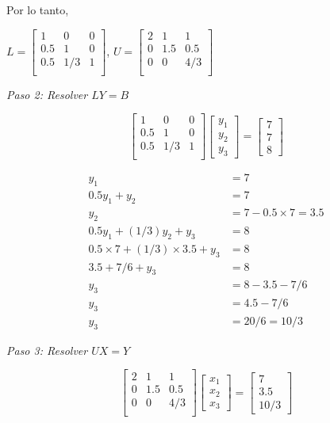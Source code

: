 \documentclass[12pt]{article}
\begin{document}
Por lo tanto,

$L = 
\begin{bmatrix}
1 & 0 & 0 \\
0.5 & 1 & 0 \\
0.5 & 1/3 & 1 \\
\end{bmatrix}$,
$U = 
\begin{bmatrix}
2 & 1 & 1 \\
0 & 1.5 & 0.5 \\
0 & 0 & 4/3 \\
\end{bmatrix}$

\textit{Paso 2: Resolver $LY = B$}

\[
\begin{bmatrix}
1 & 0 & 0 \\
0.5 & 1 & 0 \\
0.5 & 1/3 & 1 \\
\end{bmatrix}
\begin{bmatrix}
y_1 \\ y_2 \\ y_3
\end{bmatrix}
=
\begin{bmatrix}
7 \\ 7 \\ 8
\end{bmatrix}
\]

\begin{align*}
y_1 &= 7 \\
0.5y_1 + y_2 &= 7 \\
y_2 &= 7 - 0.5 \times 7 = 3.5 \\
0.5y_1 + (1/3)y_2 + y_3 &= 8 \\
0.5 \times 7 + (1/3) \times 3.5 + y_3 &= 8 \\
3.5 + 7/6 + y_3 &= 8 \\
y_3 &= 8 - 3.5 - 7/6 \\
y_3 &= 4.5 - 7/6 \\
y_3 &= 20/6 = 10/3
\end{align*}

\textit{Paso 3: Resolver $UX = Y$}

\[
\begin{bmatrix}
2 & 1 & 1 \\
0 & 1.5 & 0.5 \\
0 & 0 & 4/3 \\
\end{bmatrix}
\begin{bmatrix}
x_1 \\ x_2 \\ x_3
\end{bmatrix}
=
\begin{bmatrix}
7 \\ 3.5 \\ 10/3
\end{bmatrix}
\]
\end{document}
